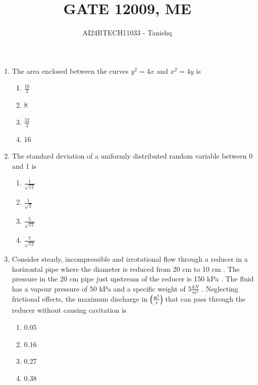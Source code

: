 \documentclass[journal]{IEEEtran}
\begin{document}

\vspace{3cm}
\author{AI24BTECH11033 - Tanishq}
\title{GATE 1}
{\let\newpage\relax\maketitle}
\title{2009, ME}
\renewcommand{\thefigure}{\theenumi}
\renewcommand{\thetable}{\theenumi}
\setlength{\intextsep}{10pt} %
\renewcommand{\thetable}{\theenumi}
\begin{enumerate}
    \item The area enclosed between the curves $ y^2=4x $ and $ x^2=4y $ is
    \begin{enumerate}
    \item  $\frac{16}{3}$
    \item  8
    \item  $\frac{32}{3}$
    \item  16
  \end{enumerate}
  \item The standard deviation of a uniformly distributed random variable between 0 and 1 is
    \begin{enumerate}
    \item  $\frac{1}{\sqrt{12}}$
    \item  $\frac{1}{\sqrt{3}}$
    \item  $\frac{5}{\sqrt{12}}$
    \item  $\frac{7}{\sqrt{12}}$
  \end{enumerate}
  \item Consider steady, incompressible and irrotational flow through a reducer in a horizontal pipe where the diameter is reduced from 20 cm to 10 cm . The pressure in the 20 cm pipe just upstream of the reducer is 150 kPa . The fluid has a vapour pressure of 50 kPa  and a specific weight of $5 \frac{kN}{m^3}$ . Neglecting frictional effects, the maximum discharge in $\left(\frac{m^3}{s}\right)$ that can pass through the reducer without causing cavitation is
   \begin{enumerate}
    \item  0.05
    \item  0.16
    \item  0.27
    \item  0.38

\end{enumerate}
\end{enumerate}
\end{document}
